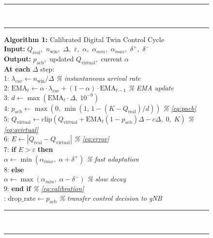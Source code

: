 \documentclass[conference]{IEEEtran}
\newcommand{\qreal}{Q_{\mathrm{real}}}
\newcommand{\qvirt}{Q_{\mathrm{virtual}}}
\newcommand{\pacb}{p_{\mathrm{acb}}}
\newcommand{\ema}{\mathrm{EMA}}
\begin{document}
\begin{figure}[t]
\vspace{-2pt}
\noindent\rule{\columnwidth}{0.5pt}\\[-5pt]
\noindent\rule{\columnwidth}{0.15pt}
\vspace{3pt}
{\small
\noindent\textbf{Algorithm 1:}
  Calibrated Digital Twin Control Cycle\\[4pt]
\noindent\textbf{Input:}
  $\qreal$,\ $n_{\mathrm{win}}$,\ $\Delta$,\ $\varepsilon$,\ $\alpha$,\
  $\alpha_{min}$,\ $\alpha_{max}$,\ $\delta^{+}$,\ $\delta^{-}$\\
\noindent\textbf{Output:}
  $\pacb$,\ updated $\qvirt$,\ current $\alpha$\\[4pt]
\noindent\textbf{At each} $\Delta$ step:\\[2pt]
\noindent\phantom{0}1:\enspace
  $\lambda_{cur} \leftarrow n_{\mathrm{win}} / \Delta$
  \hfill\textit{\% instantaneous arrival rate}\\
\noindent\phantom{0}2:\enspace
  $\ema_t \leftarrow \alpha\cdot\lambda_{cur}+(1-\alpha)\cdot\ema_{t-1}$
  \hfill\textit{\% EMA update}\\
\noindent\phantom{0}3:\enspace
  $d \leftarrow \max\!\left(\ema_t\cdot\Delta,\ 10^{-9}\right)$\\
\noindent\phantom{0}4:\enspace
  $\pacb \leftarrow \max\!\left(0,\,\min\!\left(1,\,1-(K-\qreal)/d\right)\right)$
  \hfill\textit{\% \eqref{eq:pacb}}\\
\noindent\phantom{0}5:\enspace
  $\qvirt \leftarrow
   \mathrm{clip}\!\left(\qvirt+\ema_t(1{-}\pacb)\Delta-c\Delta,\;0,\;K\right)$
  \hfill\textit{\% \eqref{eq:qvirtual}}\\
\noindent\phantom{0}6:\enspace
  $E \leftarrow \left|\qreal - \qvirt\right|$
  \hfill\textit{\% \eqref{eq:error}}\\
\noindent\phantom{0}7:\enspace
  \textbf{if} $E > \varepsilon$ \textbf{then}\\
\noindent\phantom{07:}\enspace
  $\alpha \leftarrow \min(\alpha_{max},\;\alpha + \delta^{+})$
  \hfill\textit{\% fast adaptation}\\
\noindent\phantom{0}8:\enspace
  \textbf{else}\\
\noindent\phantom{08:}\enspace
  $\alpha \leftarrow \max(\alpha_{min},\;\alpha - \delta^{-})$
  \hfill\textit{\% slow decay}\\
\noindent\phantom{0}9:\enspace
  \textbf{end if}
  \hfill\textit{\% \eqref{eq:calibration}}\\
:\enspace
  $\text{drop\_rate} \leftarrow \pacb$
  \hfill\textit{\% transfer control decision to gNB}
}
\vspace{3pt}
\noindent\rule{\columnwidth}{0.15pt}\\[-5pt]
\noindent\rule{\columnwidth}{0.5pt}
\label{alg:cdt}
\end{figure}
\end{document}
